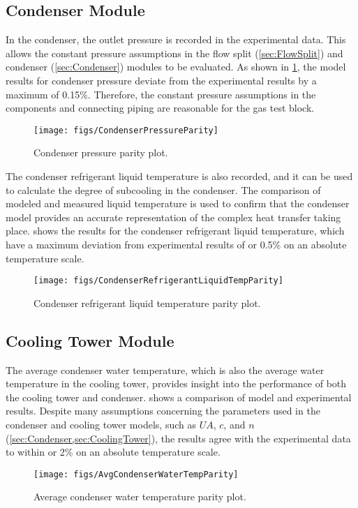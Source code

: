 \subsection{Condenser Module} \label{sec:condresult}
In the condenser, the outlet pressure is recorded in the experimental data.
This allows the constant pressure assumptions in the flow split (\cref{sec:FlowSplit})
and condenser (\cref{sec:Condenser}) modules to be evaluated.
As shown in \cref{fig:CondPressParity}, the model results for condenser pressure
deviate from the experimental results by a maximum of 0.15\%.
Therefore, the constant pressure assumptions in the components
and connecting piping are reasonable for the  gas test block.
\begin{figure}[tbp]
  \centering
  \texttt{[image: figs/CondenserPressureParity]}
  \caption{Condenser pressure parity plot.}
  \label{fig:CondPressParity}
\end{figure}

The condenser refrigerant liquid temperature is also recorded,
and it can be used to calculate the degree of subcooling in the condenser.
The comparison of modeled and measured liquid temperature is 
used to confirm that the condenser model provides an
accurate representation of the complex heat transfer taking place.
 shows the results for the condenser
refrigerant liquid temperature, which have a maximum deviation from
experimental results of  or 0.5\% on an absolute temperature scale.
\begin{figure}[tbp]
  \centering
  \texttt{[image: figs/CondenserRefrigerantLiquidTempParity]}
  \caption{Condenser refrigerant liquid temperature parity plot.}
  \label{fig:CondRefLiqTempParity}
\end{figure}

\subsection{Cooling Tower Module}
The average condenser water temperature, which is also the 
average water temperature in the cooling tower, provides insight
into the performance of both the cooling tower and condenser.
 shows a comparison of model and
experimental results.
Despite many assumptions concerning the parameters used in the condenser
and cooling tower models, such as $UA$, $c$, and $n$ (\cref{sec:Condenser,sec:CoolingTower}),
the results agree with the experimental data to within 
or 2\% on an absolute temperature scale.
\begin{figure}[tbp]
  \centering
  \texttt{[image: figs/AvgCondenserWaterTempParity]}
  \caption{Average condenser water temperature parity plot.}
  \label{fig:AvgCondWatTempParity}
  \vspace{-\baselineskip}
\end{figure}

